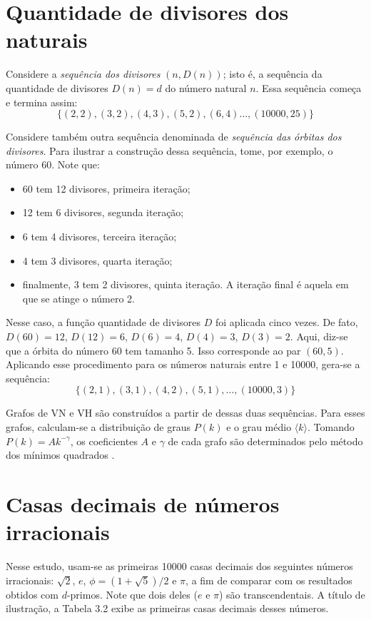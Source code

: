 \documentclass[12pt,a4paper,fleqn]{report}
\begin{document}

\section{Quantidade de divisores dos naturais}

Considere a {\it sequência dos divisores} $(n,D(n))$; isto é, a sequência da quantidade de divisores $D(n)=d$ do número natural $n$. Essa sequência começa e termina assim:
$$\{(2,2), (3,2), (4,3), (5,2), (6,4)\ldots, (10000,25)\}$$

Considere também outra sequência denominada de 
{\it sequência das órbitas dos divisores}.
 Para ilustrar  a construção dessa sequência, tome, por exemplo, o número
60. Note que:

\begin{itemize}
    \item 60 tem 12 divisores, primeira iteração;
    \item 12 tem 6 divisores, segunda iteração;
    \item 6 tem 4 divisores, terceira iteração;
    \item 4 tem 3 divisores, quarta iteração;
    \item  finalmente, 3 tem 2 divisores, quinta iteração. A iteração final é aquela em que se atinge o número 2.
\end{itemize}

Nesse caso, a função quantidade de divisores $D$ foi aplicada cinco vezes.
De fato, $D(60)=12$, $D(12)=6$, $D(6)=4$, $D(4)=3$, $D(3)=2$.
Aqui, diz-se que a órbita do número 60 tem tamanho 5. Isso  corresponde ao par $(60,5)$. Aplicando esse procedimento para os números naturais entre 1 e 10000, gera-se a sequência:
$$\{(2,1), (3,1), (4,2), (5,1),\ldots, (10000,3)\}$$

 Grafos de VN e VH são construídos  a partir de dessas duas sequências. Para esses grafos, calculam-se a distribuição de graus $P(k)$ e o grau médio $\langle k \rangle$. Tomando $P(k)=A k^{-\gamma}$, os coeficientes $A$ e $\gamma$ de cada grafo são determinados pelo método dos mínimos quadrados \cite{b03}. 

\section{Casas decimais de números irracionais}

Nesse estudo, usam-se as primeiras 10000 casas decimais
dos seguintes números irracionais: $\sqrt{2}$, $e$, $\phi=(1+\sqrt{5})/2$ e $\pi$, a fim de comparar com os resultados obtidos com $d$-primos. Note que dois deles ($e$ e $\pi$) são transcendentais. A título de ilustração,
a Tabela 3.2 exibe as primeiras casas decimais desses números.
\end{document}
